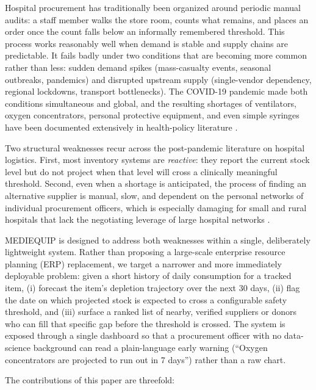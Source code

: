 \documentclass[conference]{IEEEtran}
\begin{document}
Hospital procurement has traditionally been organized around periodic manual audits: a staff member walks the store room, counts what remains, and places an order once the count falls below an informally remembered threshold. This process works reasonably well when demand is stable and supply chains are predictable. It fails badly under two conditions that are becoming more common rather than less: sudden demand spikes (mass-casualty events, seasonal outbreaks, pandemics) and disrupted upstream supply (single-vendor dependency, regional lockdowns, transport bottlenecks). The COVID-19 pandemic made both conditions simultaneous and global, and the resulting shortages of ventilators, oxygen concentrators, personal protective equipment, and even simple syringes have been documented extensively in health-policy literature \cite{b1,b2}.

Two structural weaknesses recur across the post-pandemic literature on hospital logistics. First, most inventory systems are \emph{reactive}: they report the current stock level but do not project when that level will cross a clinically meaningful threshold. Second, even when a shortage is anticipated, the process of finding an alternative supplier is manual, slow, and dependent on the personal networks of individual procurement officers, which is especially damaging for small and rural hospitals that lack the negotiating leverage of large hospital networks \cite{b3}.

MEDIEQUIP is designed to address both weaknesses within a single, deliberately lightweight system. Rather than proposing a large-scale enterprise resource planning (ERP) replacement, we target a narrower and more immediately deployable problem: given a short history of daily consumption for a tracked item, (i) forecast the item's depletion trajectory over the next 30 days, (ii) flag the date on which projected stock is expected to cross a configurable safety threshold, and (iii) surface a ranked list of nearby, verified suppliers or donors who can fill that specific gap before the threshold is crossed. The system is exposed through a single dashboard so that a procurement officer with no data-science background can read a plain-language early warning (``Oxygen concentrators are projected to run out in 7 days'') rather than a raw chart.

The contributions of this paper are threefold:
\end{document}
